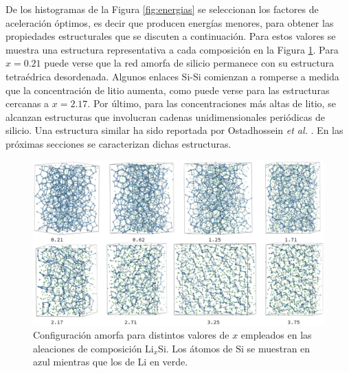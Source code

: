 De los histogramas de la Figura \ref{fig:energias} se seleccionan los factores 
de aceleración óptimos, es decir que producen energías menores, para obtener
las propiedades estructurales que se discuten a continuación. Para estos valores
se muestra una estructura representativa a cada composición en la Figura 
\ref{fig:amorfas}. Para $x = 0.21$ puede verse que la red amorfa de silicio
permanece con su estructura tetraédrica desordenada. Algunos enlaces Si-Si 
comienzan a romperse a medida que la concentración de litio aumenta, como puede
verse para las estructuras cercanas a $x = 2.17$. Por último, para las 
concentraciones más altas de litio, se alcanzan estructuras que involucran 
cadenas unidimensionales periódicas de silicio. Una estructura similar ha sido 
reportada por Ostadhossein \textit{et al.} \cite{ostadhossein2015}. En las 
próximas secciones se caracterizan dichas estructuras.
\begin{figure}[h!]
    \centering
    \includegraphics[width=\textwidth]{Silicio/caracterizacion/resultados/introduccion/amorfas.png}
    \caption{Configuración amorfa para distintos valores de $x$ empleados en las
    aleaciones de composición Li$_x$Si. Los átomos de Si se muestran en azul 
    mientras que los de Li en verde.}
    \label{fig:amorfas}
\end{figure}
